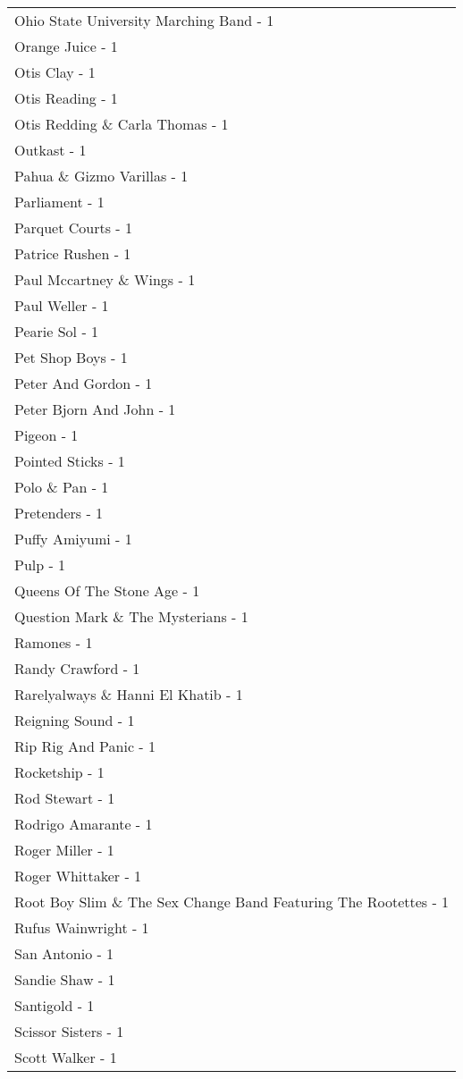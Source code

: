 \documentclass[
]{article}
\begin{document}
\begin{longtable}{l}
Ohio State University Marching Band - 1 \\ 
Orange Juice - 1 \\ 
Otis Clay - 1 \\ 
Otis Reading - 1 \\ 
Otis Redding \& Carla Thomas - 1 \\ 
Outkast - 1 \\ 
Pahua \& Gizmo Varillas - 1 \\ 
Parliament - 1 \\ 
Parquet Courts - 1 \\ 
Patrice Rushen - 1 \\ 
Paul Mccartney \& Wings - 1 \\ 
Paul Weller - 1 \\ 
Pearie Sol - 1 \\ 
Pet Shop Boys - 1 \\ 
Peter And Gordon - 1 \\ 
Peter Bjorn And John - 1 \\ 
Pigeon - 1 \\ 
Pointed Sticks - 1 \\ 
Polo \& Pan - 1 \\ 
Pretenders - 1 \\ 
Puffy Amiyumi - 1 \\ 
Pulp - 1 \\ 
Queens Of The Stone Age - 1 \\ 
Question Mark \& The Mysterians - 1 \\ 
Ramones - 1 \\ 
Randy Crawford - 1 \\ 
Rarelyalways \& Hanni El Khatib - 1 \\ 
Reigning Sound - 1 \\ 
Rip Rig And Panic - 1 \\ 
Rocketship - 1 \\ 
Rod Stewart - 1 \\ 
Rodrigo Amarante - 1 \\ 
Roger Miller - 1 \\ 
Roger Whittaker - 1 \\ 
Root Boy Slim \& The Sex Change Band Featuring The Rootettes - 1 \\ 
Rufus Wainwright - 1 \\ 
San Antonio - 1 \\ 
Sandie Shaw - 1 \\ 
Santigold - 1 \\ 
Scissor Sisters - 1 \\ 
Scott Walker - 1 \\ 

\end{longtable}
\end{document}
